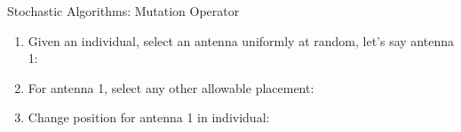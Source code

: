 \documentclass{beamer}
\begin{document}
\begin{frame}[t]{Stochastic Algorithms: Mutation Operator}
    \begin{enumerate}
        \item Given an individual, select an antenna uniformly at random, let's say antenna 1:\par
            \begin{minipage}[t]{\linewidth}
                \centering
            \end{minipage}
        \item For antenna 1, select any other allowable placement:\par
            \begin{minipage}[t]{\linewidth}
                \centering
            \end{minipage}
        \item Change position for antenna 1 in individual:\par
            \begin{minipage}[t]{\linewidth}
                \centering
            \end{minipage}
    \end{enumerate}
\end{frame}
\end{document}
